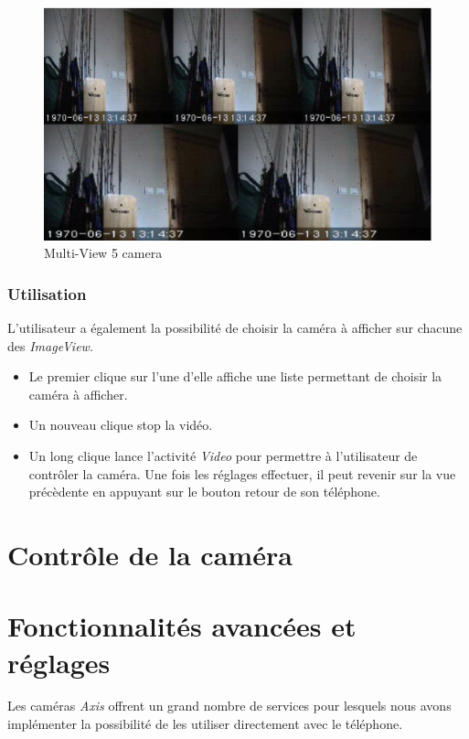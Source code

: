 \begin{figure}[H]
  \label{5cam.eps}
  \centering
   \includegraphics[scale=0.4]{Images/5cam.eps}
  \caption{Multi-View 5 camera}
\end{figure}  
\subsubsection{Utilisation}
L'utilisateur a également la possibilité de choisir la caméra à afficher sur chacune des \textit{ImageView}. 
\begin{itemize}
\item Le premier clique sur l'une d'elle affiche une liste permettant de
choisir la caméra à afficher.
\item Un nouveau clique stop la vidéo.
\item Un long clique lance l'activité \textit{Video} pour permettre à
l'utilisateur de contrôler la caméra. Une fois les réglages effectuer, il peut
revenir sur la vue précèdente en appuyant sur le bouton retour de son téléphone.
\end{itemize}

\section{Contrôle de la caméra}

\section{Fonctionnalités avancées et réglages}
Les caméras \textit{Axis} offrent un grand nombre de services pour lesquels
nous avons implémenter la possibilité de les utiliser directement avec le
téléphone.
